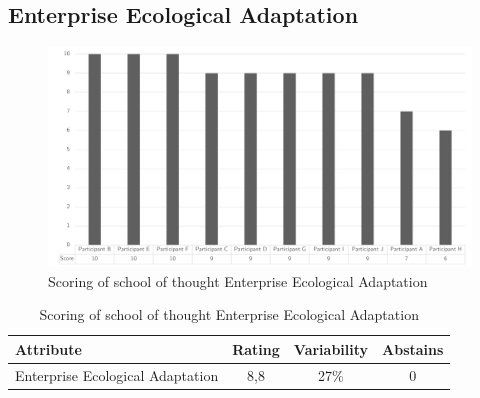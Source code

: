 \subsection{Enterprise Ecological Adaptation}
\begin{figure}[H]
	\centering
	\includegraphics[width=0.9\linewidth]{images/scoreeaschoolenterpriseecologicaladaptation}
	\caption[Scoring of school of thought Enterprise Ecological Adaptation]{Scoring of school of thought Enterprise Ecological Adaptation}
	\label{fig:appscoringschoolenterpriseecologicaladaptation}
\end{figure}
\begin{table}[H]
	\centering
	\begin{tabular}{p{}ccc}
		\toprule
		\textbf{Attribute} & \textbf{Rating} & \textbf{Variability} & \textbf{Abstains} \\
		\midrule
		Enterprise Ecological Adaptation & 8,8 & 27\% & 0 \\%
		\bottomrule
	\end{tabular}%
	\caption[Scoring of school of thought Enterprise Ecological Adaptation]{Scoring of school of thought Enterprise Ecological Adaptation}
	\label{tab:appscoringschoolenterpriseecologicaladaptation}%
\end{table}%

\newpage

